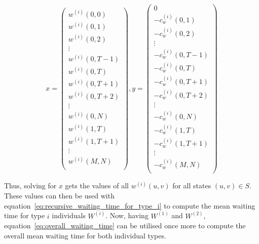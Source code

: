 \begin{equation}
    x =
    \begin{pmatrix}
        w^{(i)}(0, 0) \\
        w^{(i)}(0, 1) \\
        w^{(i)}(0, 2) \\
        \vdots \\
        w^{(i)}(0, T-1) \\
        w^{(i)}(0, T) \\
        w^{(i)}(0, T + 1) \\
        w^{(i)}(0, T + 2) \\
        \vdots \\
        w^{(i)}(0, N) \\
        w^{(i)}(1, T) \\
        w^{(i)}(1, T + 1) \\
        \vdots \\
        w^{(i)}(M, N) \\
    \end{pmatrix},
    y=
    \begin{pmatrix}
        0 \\ %
        -c^{(i)}_w(0,1) \\ %
        -c^{(i)}_w(0,2) \\ %
        \vdots \\
        -c^{(i)}_w(0,T - 1) \\ %
        -c^{(i)}_w(0,T) \\ %
        -c^{(i)}_w(0,T+1) \\
        -c^{(i)}_w(0,T+2) \\
        \vdots \\
        -c^{(i)}_w(0,N) \\
        -c^{(i)}_w(1,T) \\
        -c^{(i)}_w(1,T+1) \\
        \vdots \\
        -c^{(i)}_w(M,N) \\
    \end{pmatrix}
\end{equation}

Thus, solving for \(x\) gets the values of all \(w^{(i)}(u,v)\) for all states
\((u,v) \in S\).
These values can then be used with
equation~\eqref{eq:recursive_waiting_time_for_type_i} to compute the mean
waiting time for type \(i\) individuals \(W^{(i)}\).
Now, having \(W^{(1)}\) and \(W^{(2)}\),
equation~\eqref{eq:overall_waiting_time}
can be utilised once more to compute the overall mean waiting time for both
individual types.


